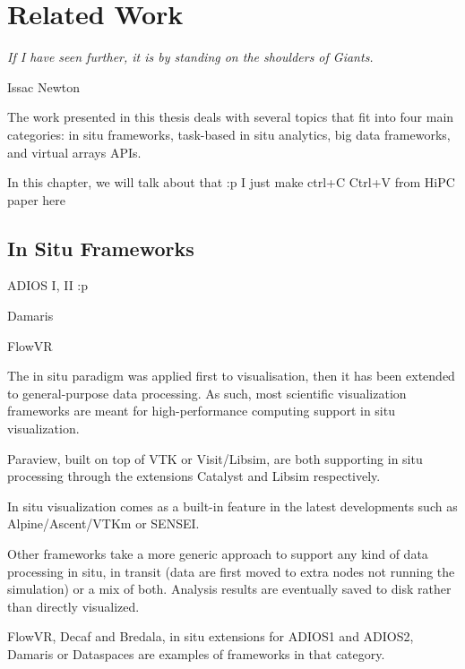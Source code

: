 
\chapter{Related Work}

\epigraph{\textit{If I have seen further, it is by standing on the shoulders of Giants.}} {Issac Newton}

\newpage

The work presented in this thesis deals with several topics that fit into four main categories: in situ frameworks, task-based in situ analytics, big data frameworks, and virtual arrays APIs. 

In this chapter, we will talk about that :p
I just make ctrl+C Ctrl+V from HiPC paper here 
\section{In Situ Frameworks}

ADIOS I, II :p 

Damaris 

FlowVR

The in situ paradigm was applied first to visualisation\cite{InSituLiuMa:2007}, then it has been extended to general-purpose data processing. As such, most scientific visualization frameworks are meant for high-performance computing support in situ visualization.

Paraview\cite{ahrens_paraview_2005}, built on top of VTK\cite{hanwell_visualization_2015_vtk} or Visit/Libsim\cite{childs_visit_nodate}, are both supporting in situ processing through the extensions Catalyst\cite{catalyst11} and Libsim\cite{libsim11} respectively.

In situ visualization comes as a built-in feature in the latest developments such as Alpine/Ascent/VTKm\cite{Larsen-alpine-isav17,moreland_vtk-m_2016} or SENSEI\cite{ayachit_sensei_2016}.

Other frameworks take a more generic approach to support any kind of data processing in situ, in transit (data are first moved to extra nodes not running the simulation) or a mix of both.
Analysis results are eventually saved to disk rather than directly visualized.

FlowVR\cite{dreher_flexible_2014}, 
Decaf\cite{dreher_decaf_2017} and Bredala\cite{dreher_bredala_2016}, 
in situ extensions for ADIOS1\cite{lofstead_insights_2013_adios,boyuka_transparent_2014_adios} and ADIOS2\cite{godoy_adios2_2020}, Damaris\cite{dorier_damaris_2012} or 
Dataspaces\cite{docan_dataspaces_2012} are examples of frameworks in that category.

